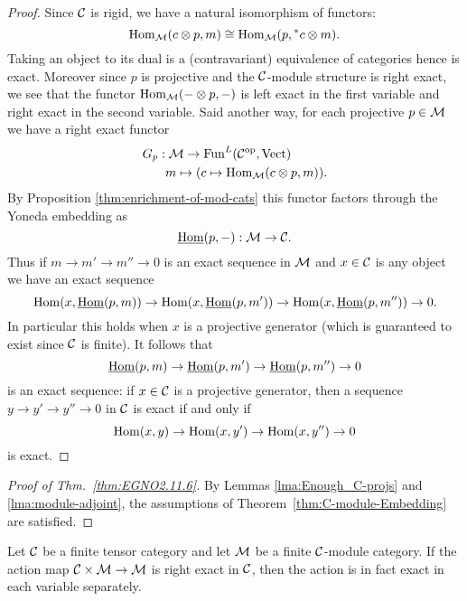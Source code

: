 \documentclass{amsart}
\begin{document}
\begin{proof}
	Since $\mathcal C$ is rigid, we have a natural isomorphism of functors:
\begin{equation*}
	\operatorname{Hom}_{\mathcal M}(c \otimes p, m) \cong \operatorname{Hom}_{\mathcal M}(p, {}^*c \otimes m).
\end{equation*}
Taking an object to its dual is a (contravariant) equivalence of categories hence is exact. Moreover since $p$ is projective and the $\mathcal C$-module structure is right exact, we see that the functor $\operatorname{Hom}_{\mathcal M}(- \otimes p, -)$ is left exact in the first variable and right exact in the second variable. Said another way, for each projective $p \in \mathcal M$ we have a right exact functor
\begin{align*}
	G_p: & \; \mathcal M \to \operatorname{Fun}^L(\mathcal C^{\mathrm{op}}, \mathrm{Vect}) \\
	& m \mapsto (c \mapsto \operatorname{Hom}_{\mathcal M}(c \otimes p, m)).
\end{align*} 
By Proposition \ref{thm:enrichment-of-mod-cats} this functor factors through the Yoneda embedding as
\begin{equation*}
	\operatorname{\underline{Hom}}(p, -): \mathcal M \to \mathcal C.
\end{equation*}
Thus if $m \to m' \to m'' \to 0$ is an exact sequence in $\mathcal M$ and $x \in \mathcal C$ is any object we have an exact sequence
\begin{equation*}
	\operatorname{Hom}(x, \operatorname{\underline{Hom}}(p,m)) \to \operatorname{Hom}(x, \operatorname{\underline{Hom}}(p,m')) \to \operatorname{Hom}(x, \operatorname{\underline{Hom}}(p,m'')) \to 0.
\end{equation*}
In particular this holds when $x$ is a projective generator (which is guaranteed to exist since $\mathcal C$ is finite). It follows that 
\begin{equation*}
	\operatorname{\underline{Hom}}(p,m) \to \operatorname{\underline{Hom}}(p,m') \to \operatorname{\underline{Hom}}(p,m'') \to 0
\end{equation*}
is an exact sequence: if $x \in \mathcal C$ is a projective generator, then a sequence $y \to y' \to y'' \to 0$ in $\mathcal C$ is exact if and only if 
\begin{equation*}
	\operatorname{Hom}(x, y) \to \operatorname{Hom}(x, y') \to \operatorname{Hom}(x, y'') \to 0
\end{equation*} 
is exact. 
\end{proof}




\begin{proof}[Proof of Thm.~\ref{thm:EGNO2.11.6}]
By Lemmas \ref{lma:Enough_C-projs} and \ref{lma:module-adjoint}, the assumptions of Theorem~\ref{thm:C-module-Embedding} are satisfied.
\end{proof}

\begin{corollary} \label{cor:biexact_action}
	Let $\mathcal C$ be a finite tensor category and let $\mathcal M$ be a finite $\mathcal C$-module category. If the action map $\mathcal C \times \mathcal M \to \mathcal M$ is right exact in $\mathcal C$, then the action is in fact exact in each variable separately.  
\end{corollary}
\end{document}
